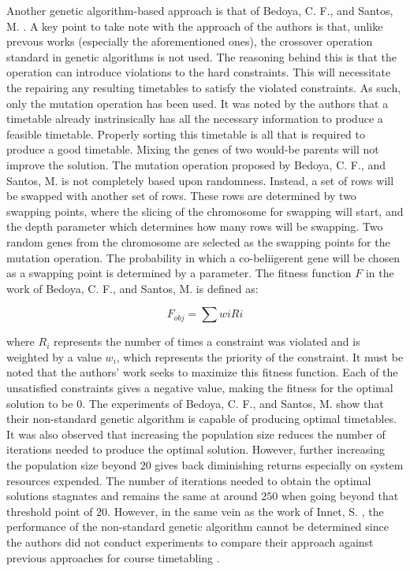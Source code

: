 Another genetic algorithm-based approach is that of Bedoya, C. F., and Santos, M. \cite{bedoya-non-standard-ga}. A key point to take note with the approach of the authors is that, unlike prevous works (especially the aforementioned ones), the crossover operation standard in genetic algorithms is not used. The reasoning behind this is that the operation can introduce violations to the hard constraints. This will necessitate the repairing any resulting timetables to satisfy the violated constraints. As such, only the mutation operation has been used. It was noted by the authors that a timetable already instrinsically has all the necessary information to produce a feasible timetable. Properly sorting this timetable is all that is required to produce a good timetable. Mixing the genes of two would-be parents will not improve the solution. The mutation operation proposed by Bedoya, C. F., and Santos, M. is not completely based upon randomness. Instead, a set of rows will be swapped with another set of rows. These rows are determined by two swapping points, where the slicing of the chromosome for swapping will start, and the depth parameter which determines how many rows will be swapping. Two random genes from the chromosome are selected as the swapping points for the mutation operation. The probability in which a co-beliigerent gene will be chosen as a swapping point is determined by a parameter. The fitness function $F$ in the work of Bedoya, C. F., and Santos, M. is defined as:

\[
	F_{obj} = \sum w{i}R{i}
\]

where $R_{i}$ represents the number of times a constraint was violated and is weighted by a value $w_{i}$, which represents the priority of the constraint. It must be noted that the authors' work seeks to maximize this fitness function. Each of the unsatisfied constraints gives a negative value, making the fitness for the optimal solution to be $0$. The experiments of Bedoya, C. F., and Santos, M. show that their non-standard genetic algorithm is capable of producing optimal timetables. It was also observed that increasing the population size reduces the number of iterations needed to produce the optimal solution. However, further increasing the population size beyond $20$ gives back diminishing returns especially on system resources expended. The number of iterations needed to obtain the optimal solutions stagnates and remains the same at around $250$ when going beyond that threshold point of $20$. However, in the same vein as the work of Innet, S. \cite{supachate-noval-approach-ga-thai}, the performance of the non-standard genetic algorithm cannot be determined since the authors did not conduct experiments to compare their approach against previous approaches for course timetabling \cite{bedoya-non-standard-ga}.

